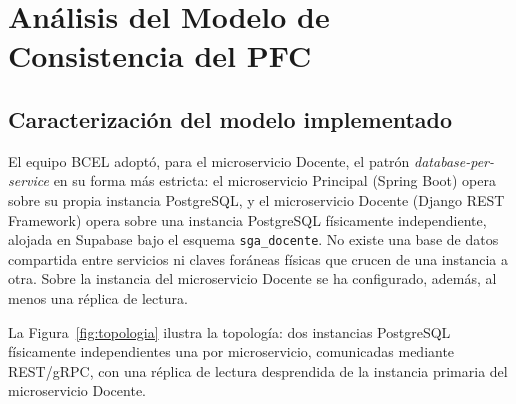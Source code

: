 \documentclass[11pt,a4paper]{article}
\begin{document}
\section{Análisis del Modelo de Consistencia del PFC}

\subsection{Caracterización del modelo implementado}

El equipo BCEL adoptó, para el microservicio Docente, el patrón \emph{database-per-service} en su forma más estricta: el microservicio Principal (Spring Boot) opera sobre su propia instancia PostgreSQL, y el microservicio Docente (Django REST Framework) opera sobre una instancia PostgreSQL físicamente independiente, alojada en Supabase bajo el esquema \texttt{sga\_docente}. No existe una base de datos compartida entre servicios ni claves foráneas físicas que crucen de una instancia a otra. Sobre la instancia del microservicio Docente se ha configurado, además, al menos una réplica de lectura.

La Figura~\ref{fig:topologia} ilustra la topología: dos instancias PostgreSQL físicamente independientes una por microservicio, comunicadas mediante REST/gRPC, con una réplica de lectura desprendida de la instancia primaria del microservicio Docente.
\end{document}
